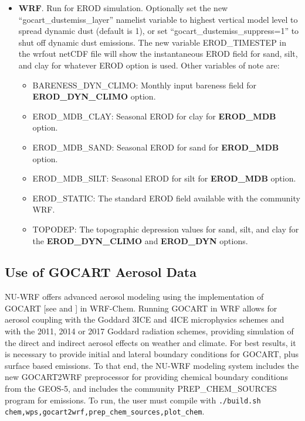 \begin{itemize}
\item \textbf{WRF}. Run for EROD simulation. Optionally set the new
``gocart\_dustemiss\_layer'' namelist variable to highest vertical model level
to spread dynamic dust (default is 1), or set 
``gocart\_dustemiss\_suppress=1'' to shut off dynamic dust emissions. The new 
variable EROD\_TIMESTEP in the wrfout netCDF file will show the instantaneous 
EROD field for sand, silt, and clay for whatever EROD option is used. Other 
variables of note are:

\begin{itemize}
\item BARENESS\_DYN\_CLIMO: Monthly input bareness field for\\
  \textbf{EROD\_DYN\_CLIMO} option.
\item EROD\_MDB\_CLAY: Seasonal EROD for clay for \textbf{EROD\_MDB} option.
\item EROD\_MDB\_SAND: Seasonal EROD for sand for \textbf{EROD\_MDB} option.
\item EROD\_MDB\_SILT: Seasonal EROD for silt for \textbf{EROD\_MDB} option.
\item EROD\_STATIC: The standard EROD field available with the community WRF.
\item TOPODEP: The topographic depression values for sand, silt, and clay
for the \textbf{EROD\_DYN\_CLIMO} and \textbf{EROD\_DYN} options.
\end{itemize}

\end{itemize}

\subsection{Use of GOCART Aerosol Data}
\label{subsec:GocartWorkflow}

NU-WRF offers advanced aerosol modeling using the implementation of GOCART
 [see \cite{ref:ChinEtAl2002} and \cite{ref:GinouxEtAl2001}] in WRF-Chem. 
Running GOCART in WRF allows for aerosol coupling with the Goddard 3ICE and 
4ICE microphysics schemes and with the 2011, 2014 or 2017 Goddard radiation 
schemes, providing simulation of the direct and indirect aerosol effects on 
weather and climate. For best results, it is necessary to provide initial and 
lateral boundary conditions for GOCART, plus surface based emissions. To that 
end, the NU-WRF modeling system includes the new GOCART2WRF preprocessor for 
providing chemical boundary conditions from the GEOS-5, and includes the 
community PREP\_CHEM\_SOURCES program for emissions. To run, the user must 
compile with
\texttt{./build.sh chem,wps,gocart2wrf,prep\_chem\_sources,plot\_chem}.

